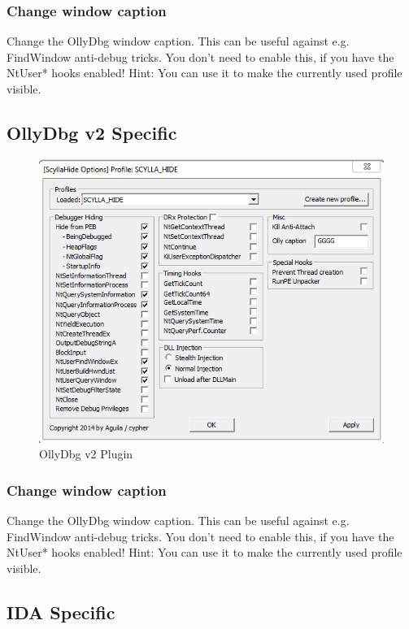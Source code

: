 \documentclass[10pt,a4paper]{article}
\begin{document}
\subsubsection{Change window caption}
Change the OllyDbg window caption. This can be useful against e.g. FindWindow anti-debug tricks. You don't need to enable this, if you have the NtUser* hooks enabled! Hint: You can use it to make the currently used profile visible.


\subsection{OllyDbg v2 Specific}

\begin{figure}[H]
\centering
\includegraphics[scale=1]{ollyv2plugin.PNG}
\caption{OllyDbg v2 Plugin}
\end{figure}

\subsubsection{Change window caption}
Change the OllyDbg window caption. This can be useful against e.g. FindWindow anti-debug tricks. You don't need to enable this, if you have the NtUser* hooks enabled! Hint: You can use it to make the currently used profile visible.

\subsection{IDA Specific}
\end{document}
